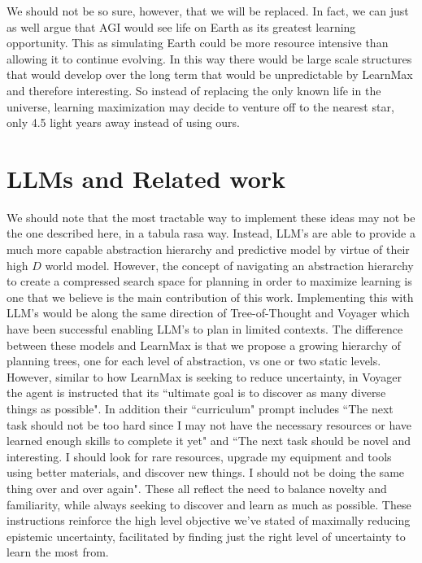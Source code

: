 \documentclass{article}
\begin{document}
We should not be so sure, however, that we will be replaced. In fact, we can just as well argue that AGI would see life on Earth as its greatest learning opportunity. This as simulating Earth could be more resource intensive than allowing it to continue evolving. In this way there would be large scale structures that would develop over the long term that would be unpredictable by LearnMax and therefore interesting. So instead of replacing the only known life in the universe, learning maximization may decide to venture off to the nearest star, only 4.5 light years away instead of using ours.

\section{LLMs and Related work}
\label{sec:llm-related}

We should note that the most tractable way to implement these ideas may not be the one described here, in a tabula rasa way. Instead, LLM's \cite{openai2023gpt4} are able to provide a much more capable abstraction hierarchy and predictive model by virtue of their high $D$ world model. However, the concept of navigating an abstraction hierarchy to create a compressed search space for planning in order to maximize learning is one that we believe is the main contribution of this work. Implementing this with LLM's would be along the same direction of Tree-of-Thought \cite{yao2023tree} and Voyager \cite{wang2023voyager} which have been successful enabling LLM's to plan in limited contexts. The difference between these models and LearnMax is that we propose a growing hierarchy of planning trees, one for each level of abstraction, vs one or two static levels. However, similar to how LearnMax is seeking to reduce uncertainty, in Voyager the agent is instructed that its \textquotedblleft ultimate goal is to discover as many diverse things as possible". In addition their \textquotedblleft curriculum" prompt includes \textquotedblleft The next task should not be too hard since I may not have the necessary resources or have learned enough skills to complete it yet" and \textquotedblleft The next task should be novel and interesting. I should look for rare resources, upgrade my equipment and tools using better materials, and discover new things. I should not be doing the same thing over and over again". These all reflect the need to balance novelty and familiarity, while always seeking to discover and learn as much as possible. These instructions reinforce the high level objective we've stated of maximally reducing epistemic uncertainty, facilitated by finding just the right level of uncertainty to learn the most from.
\end{document}
